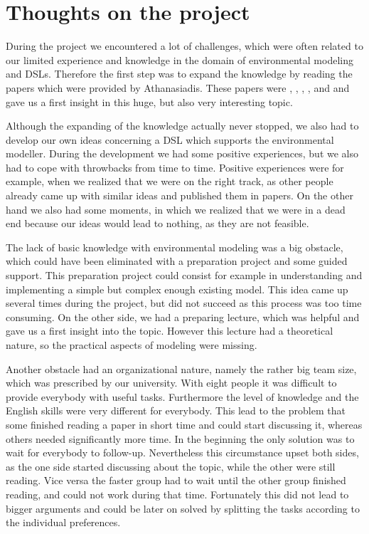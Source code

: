 \section{Thoughts on the project}
\par
During the project we encountered a lot of challenges, which were often related to our limited experience and knowledge in the domain of environmental modeling and DSLs. Therefore the first step was to expand the knowledge by reading the papers which were provided by Athanasiadis. These papers were \autocite{dsl:muetzelfeldt}, \autocite{ontology:oom_mapping}, \autocite{Villa2009577}, \autocite{Lloyd:2011:EMF:1994475.1995042}, \autocite{dsl:mernik} and \autocite{dsl:kelly} and gave us a first insight in this huge, but also very interesting topic. %
\par
Although the expanding of the knowledge actually never stopped, we also had to develop our own ideas concerning a DSL which supports the environmental modeller. During the development we had some positive experiences, but we also had to cope with throwbacks from time to time. Positive experiences were for example, when we realized that we were on the right track, as other people already came up with similar ideas and published them in papers. On the other hand we also had some moments, in which we realized that we were in a dead end because our ideas would lead to nothing, as they are not feasible.
\par
The lack of basic knowledge with environmental modeling was a big obstacle, which could have been eliminated with a preparation project and some guided support. This preparation project could consist for example in understanding and implementing a simple but complex enough existing model. This idea came up several times during the project, but did not succeed as this process was too time consuming. On the other side, we had a preparing lecture, which was helpful and gave us a first insight into the topic. However this lecture had a theoretical nature, so the practical aspects of modeling were missing.
\par
Another obstacle had an organizational nature, namely the rather big team size, which was prescribed by our university. With eight people it was difficult to provide everybody with useful tasks. Furthermore the level of knowledge and the English skills were very different for everybody. This lead to the problem that some finished reading a paper in short time and could start discussing it, whereas others needed significantly more time. In the beginning the only solution was to wait for everybody to follow-up. Nevertheless this circumstance upset both sides, as the one side started discussing about the topic, while the other were still reading. Vice versa the faster group had to wait until the other group finished reading, and could not work during that time. Fortunately this did not lead to bigger arguments and could be later on solved by splitting the tasks according to the individual preferences.
